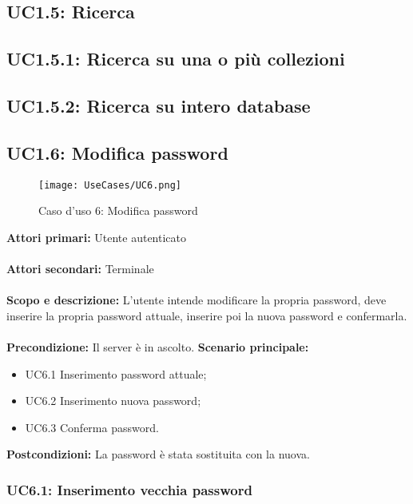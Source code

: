 \documentclass{scalatekids-article}
\begin{document}
\subsection{UC1.5: Ricerca}

\subsection{UC1.5.1: Ricerca su una o più collezioni}

\subsection{UC1.5.2: Ricerca su intero database}

\subsection{UC1.6: Modifica password}
\begin{figure}[H]
  \begin{center}
    \texttt{[image: UseCases/UC6.png]}
    \caption*{Caso d'uso 6: Modifica password}
  \end{center}
\end{figure}
\textbf{Attori primari:} Utente autenticato\\ \\
\textbf{Attori secondari:} Terminale\\ \\
\textbf{Scopo e descrizione:} L'utente intende modificare la propria password, deve inserire la propria password attuale, inserire poi la nuova password e confermarla.\\ \\
\textbf{Precondizione:} Il server è in ascolto.
\textbf{Scenario principale:}
\begin{itemize}
\item UC6.1 Inserimento password attuale;
\item UC6.2 Inserimento nuova password;
\item UC6.3 Conferma password.
\end{itemize}
\textbf{Postcondizioni:} La password è stata sostituita con la nuova.

\subsubsection{UC6.1: Inserimento vecchia password}
\end{document}
